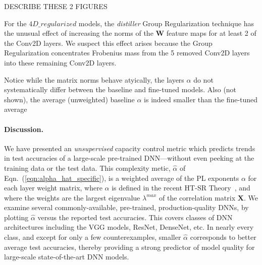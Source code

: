 DESCRIBE THESE 2 FIGURES


For the $4D\_regularized$ models, the \emph{distiller} Group Regularization technique has the unusual effect of increasing the norms of the $\mathbf{W}$ feature maps for at least 2 of the Conv2D layers.
We suspect this effect arises because the Group Regularization  concentrates Frobenius mass from the 5 removed Conv2D layers into these remaining Conv2D layers.

Notice while the matrix norms behave atyically, the layers $\alpha$ do not systematically differ between the baseline and fine-tuned models.
Also (not shown), the average (unweighted) baseline $\alpha$ is indeed smaller than the fine-tuned average

\paragraph{Discussion.}

We have presented an \emph{unsupervised} capacity control metric which predicts trends in test accuracies of a large-scale pre-trained DNN---without even peeking at the training data or the test data. 
This complexity metic, $\hat{\alpha}$ of Eqn.~(\ref{eqn:alpha_hat_specific}), is a weighted average of the PL exponents $\alpha$ for each layer weight matrix, where $\alpha$ is defined in the recent HT-SR Theory~\cite{MM18_TR,MM19_HTSR_ICML}, and where the weights are the largest eigenvalue $\lambda^{max}$ of the correlation matrix $\mathbf{X}$.  
%
We examine several commonly-available, pre-trained, production-quality DNNs, by plotting $\hat{\alpha}$ versus the reported test accuracies.
This covers classes of DNN architectures including the VGG models, ResNet, DenseNet, etc. 
In nearly every class, and except for only a few counterexamples, smaller $\hat{\alpha}$ corresponds to better average test accuracies, thereby providing a strong predictor of model quality for large-scale state-of-the-art DNN models.

